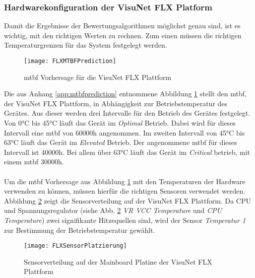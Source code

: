 \subsubsection*{Hardwarekonfiguration der VisuNet FLX Platform}\label{sec:FLXHardwarekonfiguration}
Damit die Ergebnisse der Bewertungsalgorithmen möglichst genau sind, ist es wichtig, mit den richtigen Werten zu rechnen. Zum einen müssen die richtigen Temperaturgrenzen für das System festgelegt werden. 
\begin{center}
    \begin{figure}[h!]
        \centering
        \texttt{[image: FLXMTBFPrediction]}
        \caption{\ac{mtbf} Vorhersage für die VisuNet FLX Plattform}
        \label{fig:FLXMTBF}
    \end{figure}
\end{center}
\vspace{-1.8cm}
Die aus Anhang \ref{app:mtbfprediction} entnommene Abbildung \ref{fig:FLXMTBF} stellt den \ac{mtbf}, der VisuNet FLX Plattform, in Abhängigkeit zur Betriebstemperatur des Gerätes. Aus dieser werden drei Intervalle für den Betrieb des 
Gerätes festgelegt. Von 0°C bis 45°C läuft das Gerät im \textit{Optimal} Betrieb. Dabei wird für dieses Intervall eine \ac{mtbf} von 60000h angenommen. Im zweiten Intervall von 45°C bis 63°C läuft das Gerät im \textit{Elevated} Betrieb. Der angenommene \ac{mtbf} für dieses Intervall ist 40000h. Bei allem über 63°C läuft das Gerät im \textit{Critical} betrieb, mit einem \ac{mtbf} 30000h.\\
\\
Um die \ac{mtbf} Vorhersage aus Abbildung \ref{fig:FLXMTBF} mit den Temperaturen der Hardware verwenden zu können, müssen hierfür die richtigen Sensoren verwendet werden. Abbildung \ref{fig:FLXSensoren} zeigt die Sensorverteilung auf der VisuNet FLX Plattform. Da CPU und Spannungsregulator (siehe Abb. \ref{fig:FLXSensoren} \textit{VR VCC Temperature} und \textit{CPU Temperature}) zwei signifikante Hitzequellen sind, wird der Sensor \textit{Temperatur 1} zur Bestimmung der Betriebstemperatur gewählt. 
\begin{center}
    \begin{figure}[h!]
        \centering
        \texttt{[image: FLXSensorPlatzierung]}
        \caption{Sensorverteilung auf der Mainboard Platine der VisuNet FLX Plattform}
        \label{fig:FLXSensoren}
    \end{figure}
\end{center}
\vspace{-1.8cm}  


